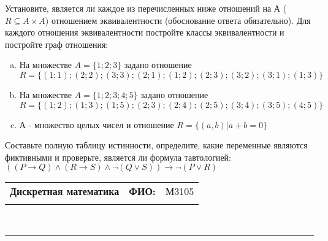 \documentclass[10pt]{exam}
\newcommand{\class}{Дискретная математика}
\newcommand{\examdate}{}
\begin{document}
\begin{questions}
\question
Установите, является ли каждое из перечисленных ниже отношений на А ($R \subseteq A \times A$) отношением эквивалентности (обоснование ответа обязательно). Для каждого отношения эквивалентности постройте классы 
эквивалентности и постройте граф отношения:
\begin{enumerate} [a)]\setcounter{enumi}{0}
\item На множестве $A = \{1; 2; 3\}$ задано отношение $R = \{(1; 1); (2; 2); (3; 3); (2; 1); (1; 2); (2; 3); (3; 2); (3; 1); (1; 3)\}$
\item На множестве $A = \{1; 2; 3; 4; 5\}$ задано отношение $R = \{(1; 2); (1; 3); (1; 5); (2; 3); (2; 4); (2; 5); (3; 4); (3; 5); (4; 5)\}$
\item А - множество целых чисел и отношение $R = \{(a,b)|a + b = 0\}$
\end{enumerate}\question Составьте полную таблицу истинности, определите, какие переменные являются фиктивными и проверьте, является ли формула тавтологией:
$((P \rightarrow Q) \land (R \rightarrow S) \land \neg (Q \lor S)) \rightarrow \neg (P \lor R)$

\end{questions}
\newpage
\begin{flushright}
\begin{tabular}{p{2.8in} r l}
\textbf{\class} & \textbf{ФИО:} &М3105
\\

\textbf{\examdate} &&\\
\end{tabular}\\
\end{flushright}
\rule[1ex]{\textwidth}{.1pt}
\end{document}
